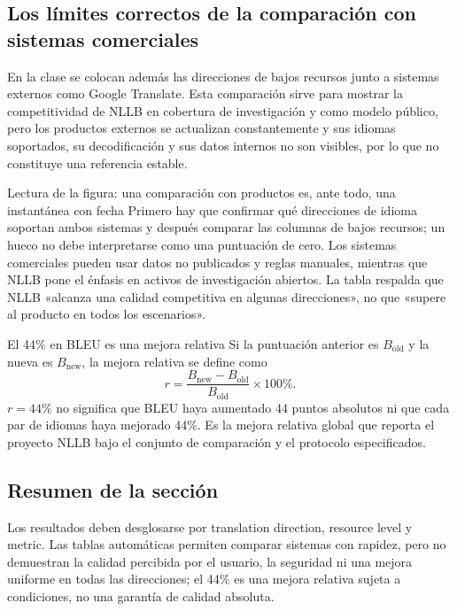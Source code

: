 \subsection{Los límites correctos de la comparación con sistemas comerciales}

En la clase se colocan además las direcciones de bajos recursos junto a sistemas externos como Google Translate. Esta comparación sirve para mostrar la competitividad de NLLB en cobertura de investigación y como modelo público, pero los productos externos se actualizan constantemente y sus idiomas soportados, su decodificación y sus datos internos no son visibles, por lo que no constituye una referencia estable.


\begin{knowledgebox}{Lectura de la figura: una comparación con productos es, ante todo, una instantánea con fecha}
Primero hay que confirmar qué direcciones de idioma soportan ambos sistemas y después comparar las columnas de bajos recursos; un hueco no debe interpretarse como una puntuación de cero. Los sistemas comerciales pueden usar datos no publicados y reglas manuales, mientras que NLLB pone el énfasis en activos de investigación abiertos. La tabla respalda que NLLB «alcanza una calidad competitiva en algunas direcciones», no que «supere al producto en todos los escenarios».
\end{knowledgebox}

\begin{importantbox}{El 44\% en BLEU es una mejora relativa}
Si la puntuación anterior es $B_{\text{old}}$ y la nueva es $B_{\text{new}}$, la mejora relativa se define como
\[
r=\frac{B_{\text{new}}-B_{\text{old}}}{B_{\text{old}}}\times100\%.
\]
$r=44\%$ no significa que BLEU haya aumentado 44 puntos absolutos ni que cada par de idiomas haya mejorado 44\%. Es la mejora relativa global que reporta el proyecto NLLB bajo el conjunto de comparación y el protocolo especificados.
\end{importantbox}


\subsection{Resumen de la sección}

Los resultados deben desglosarse por translation direction, resource level y metric. Las tablas automáticas permiten comparar sistemas con rapidez, pero no demuestran la calidad percibida por el usuario, la seguridad ni una mejora uniforme en todas las direcciones; el 44\% es una mejora relativa sujeta a condiciones, no una garantía de calidad absoluta.
